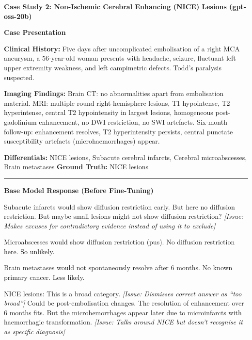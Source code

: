 \documentclass[10pt,journal,compsoc, onecolumn]{IEEEtran}
\begin{document}
\vspace{1em}

\begin{casebox}
    \textbf{Case Study 2: Non-Ischemic Cerebral Enhancing (NICE) Lesions (gpt-oss-20b)}

    \vspace{1em}
    \textbf{Case Presentation}

    \textbf{Clinical History:} Five days after uncomplicated embolisation of a right MCA aneurysm, a 56-year-old woman presents with headache, seizure, fluctuant left upper extremity weakness, and left campimetric defects. Todd's paralysis suspected.

    \vspace{0.5em}
    \textbf{Imaging Findings:} Brain CT: no abnormalities apart from embolisation material. MRI: multiple round right-hemisphere lesions, T1 hypointense, T2 hyperintense, central T2 hypointensity in largest lesions, homogeneous post-gadolinium enhancement, no DWI restriction, no SWI artefacts. Six-month follow-up: enhancement resolves, T2 hyperintensity persists, central punctate susceptibility artefacts (microhaemorrhages) appear.

    \vspace{0.5em}
    \textbf{Differentials:} NICE lesions, Subacute cerebral infarcts, Cerebral microabscesses, Brain metastases \quad \textbf{Ground Truth:} NICE lesions

    \vspace{1em}
    \hrule
    \vspace{1em}

    \textbf{Base Model Response (Before Fine-Tuning)}

    \vspace{0.5em}
    Subacute infarcts would show diffusion restriction early. But here no diffusion restriction. But maybe small lesions might not show diffusion restriction? \textit{[Issue: Makes excuses for contradictory evidence instead of using it to exclude]}

    \vspace{0.5em}
    Microabscesses would show diffusion restriction (pus). No diffusion restriction here. So unlikely.

    \vspace{0.5em}
    Brain metastases would not spontaneously resolve after 6 months. No known primary cancer. Less likely.

    \vspace{0.5em}
    NICE lesions: This is a broad category. \textit{[Issue: Dismisses correct answer as ``too broad'']} Could be post-embolisation changes. The resolution of enhancement over 6 months fits. But the microhemorrhages appear later due to microinfarcts with haemorrhagic transformation. \textit{[Issue: Talks around NICE but doesn't recognise it as specific diagnosis]}


\end{casebox}
\end{document}
